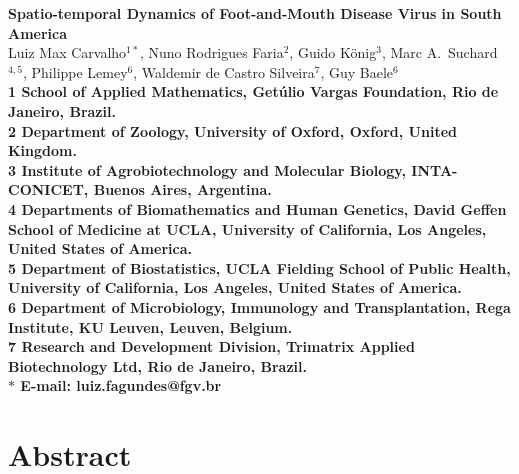 \documentclass[10pt]{article}
\date{}
\begin{document}
\begin{flushleft}
{\Large
\textbf{Spatio-temporal Dynamics of Foot-and-Mouth Disease Virus in South America}
}
\\
Luiz Max Carvalho$^{1\ast}$,
Nuno Rodrigues Faria$^{2}$,
Guido K\"onig$^{3}$,
Marc A.~Suchard$^{4,5}$,
Philippe Lemey$^{6}$,
Waldemir de Castro Silveira$^{7}$,
Guy Baele$^{6}$
\\
\bf{1} School of Applied Mathematics, Get\'ulio Vargas Foundation, Rio de Janeiro, Brazil.\\
\bf{2} Department of Zoology, University of Oxford, Oxford, United Kingdom.\\
\bf{3} Institute of Agrobiotechnology and Molecular Biology, INTA-CONICET, Buenos Aires, Argentina.\\
\bf{4} Departments of Biomathematics and Human Genetics, David Geffen School of Medicine at UCLA, University of California, Los Angeles,  United States of America.\\
\bf{5} Department of Biostatistics, UCLA Fielding School of Public Health, University of California, Los Angeles,  United States of America.\\
\bf{6} Department of Microbiology, Immunology and Transplantation, Rega Institute, KU Leuven, Leuven, Belgium.\\
\bf{7} Research and Development Division, Trimatrix Applied Biotechnology Ltd, Rio de Janeiro, Brazil.\\
$\ast$ E-mail: luiz.fagundes@fgv.br
\end{flushleft}
\section*{Abstract}
\end{document}
